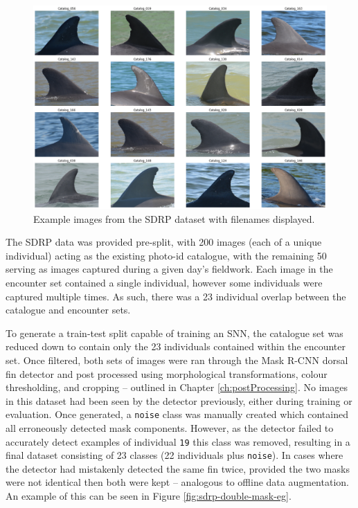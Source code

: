 \begin{figure}
	\begin{center}
		\includegraphics[scale=0.3]{Chapter7/figs/SDRP_egs_tiled.png}
	\end{center}
	\caption{Example images from the SDRP dataset with filenames displayed.}
	\label{fig:sdrp-example}
\end{figure}

The SDRP data was provided pre-split, with 200 images (each of a unique individual) acting as the existing photo-id catalogue, with the remaining 50 serving as images captured during a given day's fieldwork. Each image in the encounter set contained a single individual, however some individuals were captured multiple times. As such, there was a 23 individual overlap between the catalogue and encounter sets. 

To generate a train-test split capable of training an SNN, the catalogue set was reduced down to contain only the 23 individuals contained within the encounter set. Once filtered, both sets of images were ran through the Mask R-CNN dorsal fin detector and post processed using morphological transformations, colour thresholding, and cropping -- outlined in Chapter \ref{ch:postProcessing}. No images in this dataset had been seen by the detector previously, either during training or evaluation. Once generated, a \texttt{noise} class was manually created which contained all erroneously detected mask components. However, as the detector failed to accurately detect examples of individual \texttt{19} this class was removed, resulting in a final dataset consisting of 23 classes (22 individuals plus \texttt{noise}). In cases where the detector had mistakenly detected the same fin twice, provided the two masks were not identical then both were kept -- analogous to offline data augmentation. An example of this can be seen in Figure \ref{fig:sdrp-double-mask-eg}.

